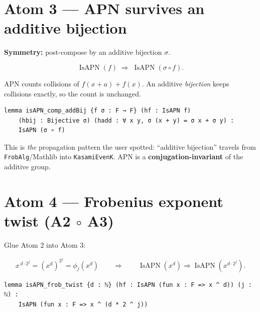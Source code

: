 \documentclass[11pt]{article}
\begin{document}
\section{Atom 3 --- APN survives an additive bijection}

\textbf{Symmetry:} post-compose by an additive bijection $\sigma$.

\[
  \operatorname{IsAPN}(f)\;\Longrightarrow\;\operatorname{IsAPN}(\sigma\circ f).
\]

APN counts collisions of $f(x{+}a)+f(x)$. An additive \emph{bijection} keeps
collisions exactly, so the count is unchanged.

\begin{lstlisting}
lemma isAPN_comp_addBij {f σ : F → F} (hf : IsAPN f)
    (hbij : Bijective σ) (hadd : ∀ x y, σ (x + y) = σ x + σ y) :
    IsAPN (σ ∘ f)
\end{lstlisting}

\begin{center}
\end{center}

\begin{coolfact}
This is \emph{the} propagation pattern the user spotted: ``additive bijection''
travels from \texttt{FrobAlg}/Mathlib into \texttt{KasamiEvenK}.
APN is a \textbf{conjugation-invariant} of the additive group.
\end{coolfact}

\section{Atom 4 --- Frobenius exponent twist (A2 $\circ$ A3)}

Glue Atom 2 into Atom 3:

\[
  x^{\,d\cdot 2^{j}}=(x^{d})^{2^{j}}=\phi_j(x^{d})
  \qquad\Rightarrow\qquad
  \operatorname{IsAPN}(x^{d})\Rightarrow\operatorname{IsAPN}(x^{d\cdot 2^{j}}).
\]

\begin{lstlisting}
lemma isAPN_frob_twist {d : ℕ} (hf : IsAPN (fun x : F => x ^ d)) (j : ℕ) :
    IsAPN (fun x : F => x ^ (d * 2 ^ j))
\end{lstlisting}
\end{document}
